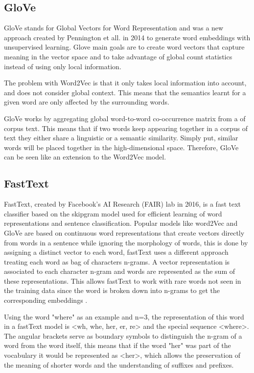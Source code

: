         
        \subsection{GloVe}
            \par GloVe stands for Global Vectors for Word Representation and was a new approach created by Pennington et all. in 2014 \cite{Pennington2014} to generate word embeddings with unsupervised learning. Glove main goals are to create word vectors that capture meaning in the vector space and to take advantage of global count statistics instead of using only local information. 
            \par The problem with Word2Vec is that it only takes local information into account, and does not consider global context. This means that the semantics learnt for a given word are only affected by the surrounding words. 
            \par GloVe works by aggregating global word-to-word co-occurrence matrix from a of corpus text. This means that if two words keep appearing together in a corpus of text they either share a linguistic or a semantic similarity. Simply put, similar words will be placed together in the high-dimensional space. Therefore, GloVe can be seen like an extension to the Word2Vec model.

        \subsection{FastText}

        \par FastText, created by Facebook's AI Research (FAIR) lab in 2016, is a fast text classifier based on the skipgram model  used for efficient learning of word representations and sentence classification. Popular models like word2Vec and GloVe  are based on continuous word representations that create vectors directly from words in a sentence while ignoring the morphology of words, this is done by assigning a distinct vector to each word, fastText uses a different approach treating each word as bag of characters n-grams. A vector representation is associated to each character n-gram and words are represented as the sum of these representations. This allows fastText to work with rare words not seen in the training data since the word is broken down into n-grams to get the corresponding embeddings \cite{bojanowski2016enriching}.


        \par Using the word "where" as an example and n=3, the representation of this word in a fastText model is <wh, whe, her, er, re> and the special sequence <where>. The angular brackets serve as boundary symbols to distinguish the n-gram of a word from the word itself, this means that if the word "her" was part of the vocabulary it would be represented as <her>, which allows the preservation of the meaning of shorter words and the understanding of suffixes and prefixes.

